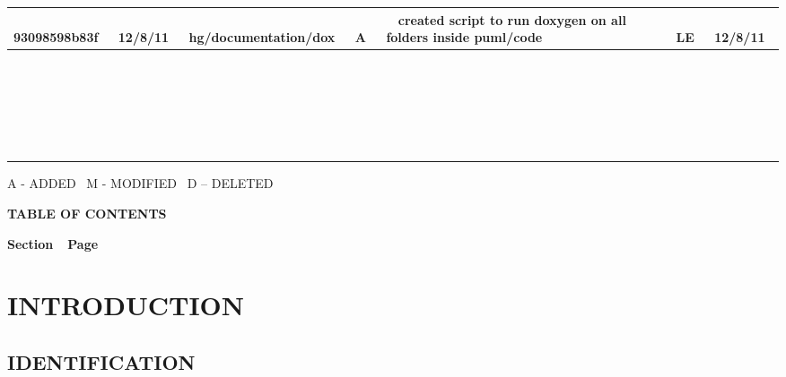 \documentclass[twoside,letterpaper]{article}
\begin{document}
\begin{flushleft}
\begin{supertabular}{|m{1.0in}|m{0.6in}|p{1.5in}|m{.25in}|m{2.0in}|m{.7in}|m{0.65in}|}
\\\hline
~
93098598b83f &
~
12/8/11 &
~
hg/documentation/dox &
~
A &
~
created script to run doxygen on all folders inside puml/code &
~
LE &
~
12/8/11

\\\hline
~
 &
~
 &
~
 &
~
 &
~
 &
~
 &
~
\\\hline
~
 &
~
 &
~
 &
~
 &
~
 &
~
 &
~
\\\hline
~
 &
~
 &
~
 &
~
 &
~
 &
~
 &
~
\\\hline
~
 &
~
 &
~
 &
~
 &
~
 &
~
 &
~
\\\hline
~
 &
~
 &
~
 &
~
 &
~
 &
~
 &
~
\\\hline
\end{supertabular}
\end{flushleft}
{\color{black}
A - ADDED \ M - MODIFIED \ D -- DELETED}


{\centering{}\bfseries\color{black}
TABLE OF CONTENTS
\par}

{\bfseries\color{black}
Section\ \ Page}

\setcounter{tocdepth}{9}
\renewcommand\contentsname{}
\tableofcontents

\bigskip

\bigskip
\clearpage\setcounter{page}{1}\pagestyle{Convertiv}
\section[INTRODUCTION]{\bfseries\color{black}
INTRODUCTION}

\subsection{IDENTIFICATION}
\end{document}
